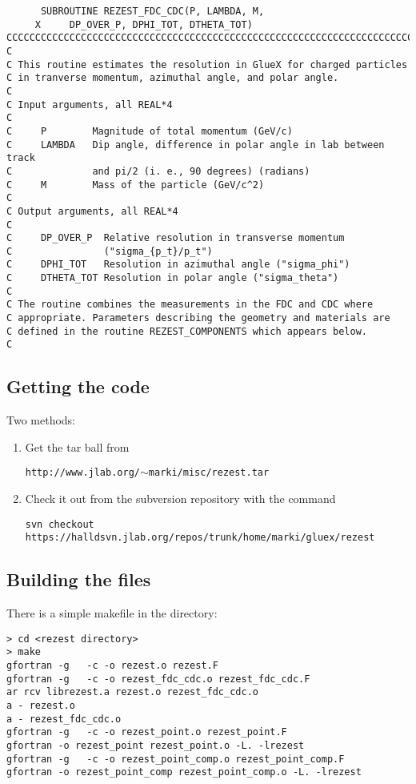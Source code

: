\documentclass{article}
\begin{document}
\small
\begin{verbatim}
      SUBROUTINE REZEST_FDC_CDC(P, LAMBDA, M,
     X     DP_OVER_P, DPHI_TOT, DTHETA_TOT)
CCCCCCCCCCCCCCCCCCCCCCCCCCCCCCCCCCCCCCCCCCCCCCCCCCCCCCCCCCCCCCCCCCCCCCCC
C
C This routine estimates the resolution in GlueX for charged particles
C in tranverse momentum, azimuthal angle, and polar angle.
C
C Input arguments, all REAL*4
C
C     P        Magnitude of total momentum (GeV/c)
C     LAMBDA   Dip angle, difference in polar angle in lab between track
C              and pi/2 (i. e., 90 degrees) (radians)
C     M        Mass of the particle (GeV/c^2)
C
C Output arguments, all REAL*4
C
C     DP_OVER_P  Relative resolution in transverse momentum
C                ("sigma_{p_t}/p_t")
C     DPHI_TOT   Resolution in azimuthal angle ("sigma_phi")
C     DTHETA_TOT Resolution in polar angle ("sigma_theta")
C
C The routine combines the measurements in the FDC and CDC where
C appropriate. Parameters describing the geometry and materials are
C defined in the routine REZEST_COMPONENTS which appears below.
C
\end{verbatim}
\normalsize

\subsection{Getting the code}

Two methods:

\begin{enumerate}
\item Get the tar ball from
\begin{center}
{\tt http://www.jlab.org/$\sim$marki/misc/rezest.tar}
\end{center}
\item Check it out from the subversion repository with the command
\begin{center}
{\tt svn checkout
 https://halldsvn.jlab.org/repos/trunk/home/marki/gluex/rezest}
\end{center}
\end{enumerate}

\subsection{Building the files}

There is a simple makefile in the directory:

\begin{verbatim}
> cd <rezest directory>
> make
gfortran -g   -c -o rezest.o rezest.F
gfortran -g   -c -o rezest_fdc_cdc.o rezest_fdc_cdc.F
ar rcv librezest.a rezest.o rezest_fdc_cdc.o
a - rezest.o
a - rezest_fdc_cdc.o
gfortran -g   -c -o rezest_point.o rezest_point.F
gfortran -o rezest_point rezest_point.o -L. -lrezest
gfortran -g   -c -o rezest_point_comp.o rezest_point_comp.F
gfortran -o rezest_point_comp rezest_point_comp.o -L. -lrezest
\end{verbatim}
\end{document}
